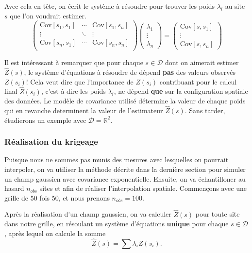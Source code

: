 \documentclass[10pt]{article} %
\begin{document}
Avec cela en tête, on écrit le système à résoudre pour trouver les poids $\lambda_i$ au site $s$ que l'on voudrait estimer.
\begin{equation}
\begin{pmatrix}
    \text{Cov}[s_1, s_1] & \cdots & \text{Cov}[s_1, s_n] \\
    \vdots & \ddots & \vdots \\
    \text{Cov}[s_n, s_1] & \cdots & \text{Cov}[s_n, s_n] \\
\end{pmatrix}
\begin{pmatrix}
    \lambda_1 \\
    \vdots \\
    \lambda_n
\end{pmatrix}
=
\begin{pmatrix}
    \text{Cov}[s, s_1] \\
    \vdots \\
    \text{Cov}[s, s_n]
\end{pmatrix}
\end{equation}

Il est intéressant à remarquer que pour chaque $s \in \mathcal{D}$ dont on aimerait estimer $\hat Z(s)$, le système d'équations à résoudre de dépend
\textbf{pas} des valeurs observés $Z(s_i)$! Cela veut dire que l'importance de $Z(s_i)$ contribuant pour le calcul final $\hat Z(s_i)$, c'est-à-dire les poids $\lambda_i$, ne dépend \textbf{que}
sur la configuration spatiale des données. Le modèle de covariance utilisé détermine la valeur de chaque poids qui en revanche determinent la valeur de l'estimateur
$\hat Z(s)$. Sans tarder, étudierons un exemple avec $\mathcal{D} = \mathbb{R}^2$.

\subsubsection{Réalisation du krigeage}

Puisque nous ne sommes pas munis des mesures avec lesquelles on pourrait interpoler, on va utiliser la méthode décrite dans la dernière section pour simuler un champ gaussien
avec covariance exponentielle. Ensuite, on va échantilloner au hasard $n_{obs}$ sites et afin de réaliser l'interpolation spatiale. Commen\c cons avec une grille de 50 fois 50,
et nous prenons $n_{obs} = 100$.

Après la réalisation d'un champ gaussien, on va calculer $\hat Z(s)$ pour toute site dans notre grille, en résoulant un système d'équations \textbf{unique} pour chaque $s \in \mathcal{D}$, après
lequel on calcule la somme $$ \hat Z(s) =  \sum \lambda_i Z(s_i).$$
\end{document}
